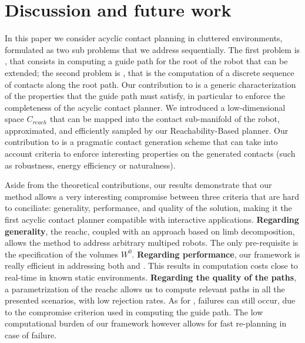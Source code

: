  \section{Discussion and future work} 
\label{sec:conclusion}

In this paper we consider acyclic contact planning in cluttered environments, formulated as two sub problems that we address sequentially.
The first problem is \Pa, that consists in computing a guide path for the root of the robot that can be extended; the second problem is \Pb, that is the computation of a discrete sequence of contacts along the root path.
Our contribution to \Pa is a generic characterization of the properties that the guide path must satisfy, in particular to enforce the completeness of the acyclic contact planner. We introduced a low-dimensional space $C_{reach}$ that can be mapped 
into the contact sub-manifold of the robot, approximated, and efficiently sampled by our Reachability-Based planner.
Our contribution to \Pb is a pragmatic contact generation scheme that can take into
account criteria to enforce interesting properties on the generated contacts (such as robustness, energy efficiency or naturalness).

Aside from the theoretical contributions, our results demonstrate that our method allows a very interesting compromise between three 
criteria that are hard to conciliate: generality, performance, and quality of the solution, making it the first acyclic contact
planner compatible with \gls{interactive} applications.
%
\textbf{Regarding generality}, the \gls{reachc}, coupled with an approach based on limb decomposition, 
allows the method to address arbitrary multiped robots. The only pre-requisite is the specification 
of the volumes $W^0$.
%
\textbf{Regarding performance}, our framework is really efficient in addressing both \Pa and \Pb. This results in computation costs close to real-time in
known static environments.
%
\textbf{Regarding the quality of the paths}, a parametrization of the \gls{reachc} allows us to compute
relevant paths in all the presented scenarios, with low rejection rates.
As for \cite{Bouyarmane2009}, failures can still occur, due to the compromise criterion used in computing the guide path.
The low computational burden of our framework however allows for fast re-planning in case of failure.

